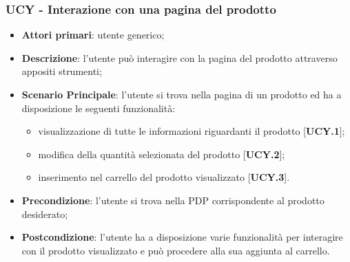 \subsubsection{UCY - Interazione con una pagina del prodotto}
\begin{itemize}
\item \textbf{Attori primari}: utente generico;
\item \textbf{Descrizione}: l'utente può interagire con la pagina del prodotto attraverso appositi strumenti;
\item \textbf{Scenario Principale}: l'utente si trova nella pagina di un prodotto ed ha a disposizione le seguenti funzionalità:
\begin{itemize}
\item visualizzazione di tutte le informazioni riguardanti il prodotto [\textbf{UCY.1}];
\item modifica della quantità selezionata del prodotto [\textbf{UCY.2}];
\item inserimento nel carrello del prodotto visualizzato [\textbf{UCY.3}].
\end{itemize}
\item \textbf{Precondizione}: l'utente si trova nella PDP corrispondente al prodotto desiderato;
\item \textbf{Postcondizione}: l'utente ha a disposizione varie funzionalità per interagire con il prodotto visualizzato e può procedere alla sua aggiunta al carrello.
\end{itemize}
